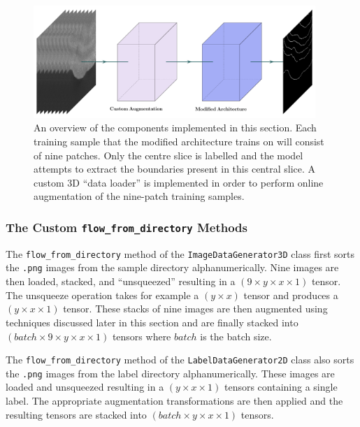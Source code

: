 \begin{figure}[t]
    \centering
    \includegraphics[width=0.95\textwidth]{images/3D-overview.pdf}
    \caption{An overview of the components implemented in this section. Each training sample that the modified architecture trains on will consist of nine patches. Only the centre slice is labelled and the model attempts to extract the boundaries present in this central slice. A custom 3D ``data loader'' is implemented in order to perform online augmentation of the nine-patch training samples.}
    \label{fig:3doverview}
\end{figure}

\subsubsection{The Custom \texttt{flow\_from\_directory} Methods}

The \texttt{flow\_from\_directory} method of the \texttt{ImageDataGenerator3D} class first sorts the \texttt{.png} images from the sample directory alphanumerically. Nine images are then loaded, stacked, and ``unsqueezed'' resulting in a $(9 \times y \times x \times 1)$ tensor. The unsqueeze operation takes for example a $(y \times x)$ tensor and produces a $(y \times x \times 1)$ tensor. These stacks of nine images are then augmented using techniques discussed later in this section and are finally stacked into $(batch \times 9 \times y \times x \times 1)$ tensors where $batch$ is the batch size.

The \texttt{flow\_from\_directory} method of the \texttt{LabelDataGenerator2D} class also sorts the \texttt{.png} images from the label directory alphanumerically. These images are loaded and unsqueezed resulting in a $(y \times x \times 1)$ tensors containing a single label. The appropriate augmentation transformations are then applied and the resulting tensors are stacked into $(batch \times y \times x \times 1)$ tensors.

